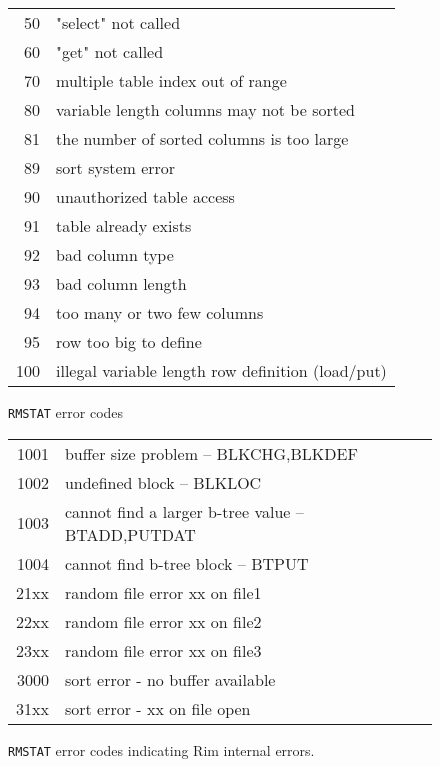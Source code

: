 \begin{figure}[p]
\begin{tabular}{rl}
 50& "select" not called                                     \\
 60& "get" not called                                      \\
 70& multiple table index out of range                \\
 80& variable length columns may not be sorted          \\
 81& the number of sorted columns is too large          \\
 89& sort system error                                     \\
 90& unauthorized table access                          \\
 91& table already exists                               \\
 92& bad column type                                    \\
 93& bad column length                                  \\
 94& too many or two few columns                        \\
 95& row too big to define                                 \\
100& illegal variable length row definition (load/put)     \\
\end{tabular}
\caption{{\tt RMSTAT} error codes}
\label{rmstat}
\end{figure}
 
\begin{figure}[t]
\centering
\begin{tabular}{rl}
1001& buffer size problem -- BLKCHG,BLKDEF                 \\
1002& undefined block -- BLKLOC                            \\
1003& cannot find a larger b-tree value -- BTADD,PUTDAT    \\
1004& cannot find b-tree block -- BTPUT                    \\
21xx& random file error xx on file1                        \\
22xx& random file error xx on file2                        \\
23xx& random file error xx on file3  \\
3000& sort error - no buffer available \\
31xx& sort error - xx on file open
\end{tabular}
\caption{{\tt RMSTAT} error codes indicating Rim internal errors.}
\label{rmstat-system}
\end{figure}
 
